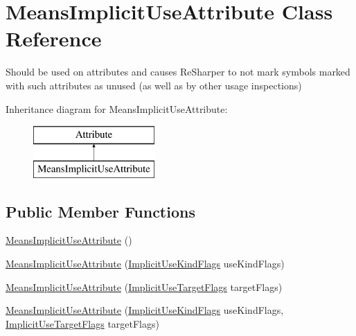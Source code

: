 \hypertarget{class_means_implicit_use_attribute}{}\section{Means\+Implicit\+Use\+Attribute Class Reference}
\label{class_means_implicit_use_attribute}


Should be used on attributes and causes Re\+Sharper to not mark symbols marked with such attributes as unused (as well as by other usage inspections)  


Inheritance diagram for Means\+Implicit\+Use\+Attribute\+:\begin{figure}[H]
\begin{center}
\leavevmode
\includegraphics[height=2.000000cm]{class_means_implicit_use_attribute}
\end{center}
\end{figure}
\subsection*{Public Member Functions}
\begin{DoxyCompactItemize}
\item 
\mbox{\hyperlink{class_means_implicit_use_attribute_ae37aa98103c42c47a777628dcbbc775b}{Means\+Implicit\+Use\+Attribute}} ()
\item 
\mbox{\hyperlink{class_means_implicit_use_attribute_af0c6d4beebf8b380eaf035edd09300a7}{Means\+Implicit\+Use\+Attribute}} (\mbox{\hyperlink{_annotations_8cs_acc26806cec0b003502b38c6c2ee67fd1}{Implicit\+Use\+Kind\+Flags}} use\+Kind\+Flags)
\item 
\mbox{\hyperlink{class_means_implicit_use_attribute_a8f8f931eac84355d49a80623c3a111f6}{Means\+Implicit\+Use\+Attribute}} (\mbox{\hyperlink{_annotations_8cs_a59f21202ead30f3d1e2093e42214bf7c}{Implicit\+Use\+Target\+Flags}} target\+Flags)
\item 
\mbox{\hyperlink{class_means_implicit_use_attribute_afca4dbb9e0585f981db7b5b29ff4f664}{Means\+Implicit\+Use\+Attribute}} (\mbox{\hyperlink{_annotations_8cs_acc26806cec0b003502b38c6c2ee67fd1}{Implicit\+Use\+Kind\+Flags}} use\+Kind\+Flags, \mbox{\hyperlink{_annotations_8cs_a59f21202ead30f3d1e2093e42214bf7c}{Implicit\+Use\+Target\+Flags}} target\+Flags)
\end{DoxyCompactItemize}
